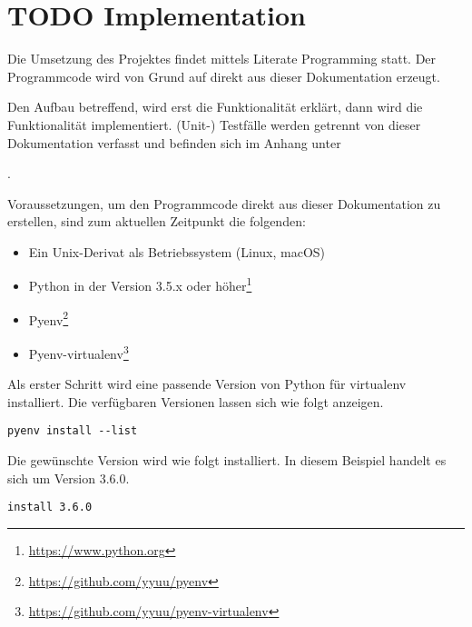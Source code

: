 \documentclass[10pt, openright, notitlepage]{scrreprt}
\begin{document}
\chapter{{\bfseries\sffamily TODO} Implementation}
\label{sec:org756301f}

Die Umsetzung des Projektes findet mittels Literate Programming statt.
Der Programmcode wird von Grund auf direkt aus dieser Dokumentation erzeugt.

Den Aufbau betreffend, wird erst die Funktionalität erklärt, dann wird die
Funktionalität implementiert. (Unit-) Testfälle werden getrennt von dieser
Dokumentation verfasst und befinden sich im Anhang unter 
\begin{center}
\end{center}
.

Voraussetzungen, um den Programmcode direkt aus dieser Dokumentation zu
erstellen, sind zum aktuellen Zeitpunkt die folgenden:

\begin{itemize}
\item Ein Unix-Derivat als Betriebssystem (Linux, macOS)
\item Python in der Version 3.5.x oder höher\footnote{\url{https://www.python.org}}
\item Pyenv\footnote{\url{https://github.com/yyuu/pyenv}}
\item Pyenv-virtualenv\footnote{\url{https://github.com/yyuu/pyenv-virtualenv}}
\end{itemize}

Als erster Schritt wird eine passende Version von Python für virtualenv
installiert. Die verfügbaren Versionen lassen sich wie folgt anzeigen.

\begin{listing}[H]
\begin{verbatim}
pyenv install --list
\end{verbatim}
\caption{\label{org9795c64}
Anzeige der verfügbaren Python-Versionen für Pyenv.}
\end{listing}

Die gewünschte Version wird wie folgt installiert. In diesem Beispiel handelt es
sich um Version 3.6.0.

\begin{listing}[H]
\begin{verbatim}
install 3.6.0
\end{verbatim}
\caption{\label{org472a03d}
Installation von Python in der Version 3.6.0 für Pyenv.}
\end{listing}
\end{document}
